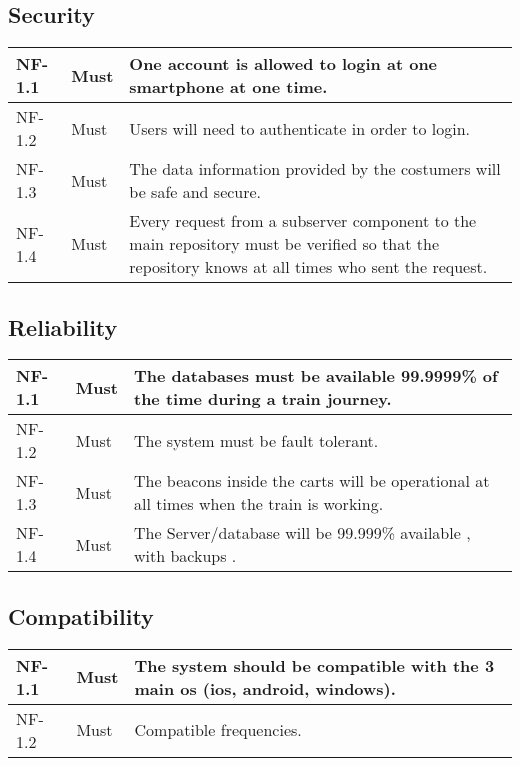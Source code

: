 \subsection{Security}
{
  \renewcommand{\arraystretch}{1.5}
  \begin{table}[H]
    \centering
    \begin{tabularx}{\textwidth}{l|l|X}
      NF-1.1 &Must & One account is allowed to login at one smartphone at one time.\\ \hline
      NF-1.2 &Must & Users will need to authenticate in order to login. \\ \hline
      NF-1.3 &Must & The data information provided by the costumers will be safe and secure. \\ \hline
      NF-1.4 &Must & Every request from a subserver component to the main repository must be verified so that the repository knows at all times who sent the request. \\  
    \end{tabularx}
  \end{table}
}

\subsection{Reliability}
{
  \renewcommand{\arraystretch}{1.5}
  \begin{table}[H]
    \centering
    \begin{tabularx}{\textwidth}{l|l|X}
      NF-1.1 &Must & The databases must be available 99.9999\% of the time during a train journey.\\ \hline
      NF-1.2 &Must & The system must be fault tolerant.  \\ \hline
      NF-1.3 &Must & The beacons inside the carts will be operational at all times when the train is working. \\ \hline
      NF-1.4 &Must & The Server/database will be 99.999\% available , with backups . \\  
    \end{tabularx}
  \end{table}
}

\subsection{Compatibility}
{
  \renewcommand{\arraystretch}{1.5}
  \begin{table}[H]
    \centering
    \begin{tabularx}{\textwidth}{l|l|X}
      NF-1.1 &Must & The system should be compatible with the 3 main os (ios, android, windows). \\ \hline
      NF-1.2 &Must & Compatible frequencies. \\ 
     
    \end{tabularx}
  \end{table}
}